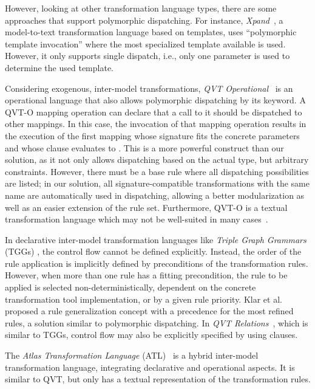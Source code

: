However, looking at other transformation language types, there are some approaches that support polymorphic dispatching. 
For instance, \emph{Xpand}~\cite{xpand}, a model-to-text transformation language based on templates, uses ``polymorphic template invocation'' where the most specialized template available is used.
However, it only supports single dispatch, i.e., only one parameter is used to determine the used template.   

Considering exogenous, inter-model transformations, \emph{QVT Operational}~\cite{QVT} is an operational language that also allows polymorphic dispatching by its  keyword.
A QVT-O mapping operation can declare that a call to it should be dispatched to other mappings.
In this case, the invocation of that mapping operation results in the execution of the first mapping whose signature fits the concrete parameters and whose  clause evaluates to .
This is a more powerful construct than our solution, as it not only allows dispatching based on the actual type, but arbitrary constraints.
However, there must be a base rule where all dispatching possibilities are listed;
in our solution, all signature-compatible transformations with the same name are automatically used in dispatching, allowing a better modularization as well as an easier extension of the rule set.      
Furthermore, QVT-O is a textual transformation language which may not be well-suited in many cases~\cite{Moo09}.

In declarative inter-model transformation languages like \emph{Triple Graph Grammars} (TGGs) \cite{Sch94}, the control flow cannot be defined explicitly.
Instead, the order of the rule application is implicitly defined by preconditions of the transformation rules.
However, when more than one rule has a fitting precondition, the rule to be applied is selected non-deterministically, dependent on the concrete transformation tool implementation, or by a given rule priority.
Klar et al. \cite{Klar07} proposed a rule generalization concept with a precedence for the most refined rules, a solution similar to polymorphic dispatching.
In \emph{QVT Relations}~\cite{QVT}, which is similar to TGGs, control flow may also be explicitly specified by using  clauses.

The \emph{Atlas Transformation Language} (ATL)~\cite{ATL} is a hybrid inter-model transformation language, integrating declarative and operational aspects.
It is similar to QVT, but only has a textual representation of the transformation rules.

